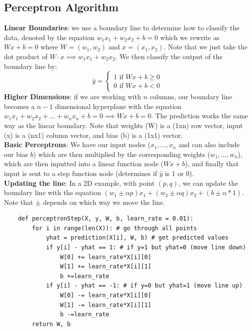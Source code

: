 \documentclass[11pt, a4paper]{article}
\begin{document}
\begin{spacing}{1.1}
	\subsection{Perceptron Algorithm}
	\textbf{Linear Boundaries}: we use a boundary line to determine how to classify the data, denoted by the equation $w_1x_1 + w_2x_2 + b = 0$ which we rewrite as $Wx+b = 0$ where $W=(w_1,w_2)$ and $x=(x_1,x_2)$. Note that we just take the dot product of $W\cdot x \implies w_1x_1 + w_2x_2$. We then classify the output of the boundary line by:
	$$\hat{y} = \begin{cases}
	1 \text{ if } Wx+b \geq 0\\
	0 \text{ if } Wx+b < 0
	\end{cases} $$
	\textbf{Higher Dimensions}: if we are working with $n$ columns, our boundary line becomes a $n-1$ dimensional hyperplane with the equation $w_1x_1 + w_2x_2 + ... + w_nx_n + b = 0 \implies Wx+b = 0$. The prediction works the same way as the linear boundary. Note that weights (W) is a (1xn) row vector, input (x) is a (nx1) column vector, and bias (b) is a (1x1) vector.\vspace*{2mm}\\
	\textbf{Basic Perceptrons}: We have our input nodes ($x_1,...,x_n$ and can also include our bias $b$) which are then multiplied by the corresponding weights ($w_1,...,w_n$), which are then inputted into a linear function node ($Wx+b$), and finally that input is sent to a step function node (determines if $\hat{y}$ is 1 or 0).\vspace*{2mm}\\
	\textbf{Updating the line}: In a 2D example, with point $(p,q)$, we can update the boundary line with the equation $ (w_1\pm\alpha p)x_1 + (w_2\pm\alpha q)x_2 + (b\pm\alpha*1)$. Note that $\pm$ depends on which way we move the line.
	\begin{lstlisting}
	def perceptronStep(X, y, W, b, learn_rate = 0.01):
		for i in range(len(X)): # go through all points
			yhat = prediction(X[i], W, b) # get predicted values
			if y[i] - yhat == 1: # if y=1 but yhat=0 (move line down)
				W[0] += learn_rate*X[i][0]
				W[1] += learn_rate*X[i][1]
				b +=learn_rate
			if y[i] - yhat == -1: # if y=0 but yhat=1 (move line up)
				W[0] -= learn_rate*X[i][0]
				W[1] -= learn_rate*X[i][1]
				b -=learn_rate    
		return W, b	\end{lstlisting} \vspace*{2mm}
	

\end{spacing}
\end{document}
